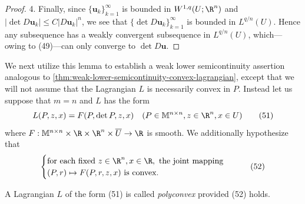 \begin{proof}
4. Finally, since $\{\mathbf{u}_k\}_{k=1}^\infty$ is bounded in $W^{1,q}(U;\R^n)$ and $|\det D\mathbf{u}_k| \leq C|D\mathbf{u}_k|^n$, we see that $\{\det D\mathbf{u}_k\}_{k=1}^\infty$ is bounded in $L^{q/n}(U)$. Hence any subsequence has a weakly convergent subsequence in $L^{q/n}(U)$, which---owing to (49)---can only converge to $\det D\mathbf{u}$.
\end{proof}

We next utilize this lemma to establish a weak lower semicontinuity assertion analogous to \cref{thm:weak-lower-semicontinuity-convex-lagrangian}, except that we will not assume that the Lagrangian $L$ is necessarily convex in $P$. Instead let us suppose that $m = n$ and $L$ has the form
\[
L(P, z, x) = F(P, \det P, z, x) \quad (P \in \mathbb{M}^{n \times n}, z \in \R^n, x \in U)
\tag{51}
\]
where $F : \mathbb{M}^{n \times n} \times \R \times \R^n \times \overline{U} \to \R$ is smooth. We additionally hypothesize that
\[
\begin{cases}
\text{for each fixed } z \in \R^n, x \in \R, \text{ the joint mapping} \\
(P, r) \mapsto F(P, r, z, x) \text{ is convex}.
\end{cases}
\tag{52}
\]

\begin{definition}
\label{def:polyconvex-lagrangian}
A Lagrangian $L$ of the form (51) is called \textit{polyconvex} provided (52) holds.
\end{definition}

